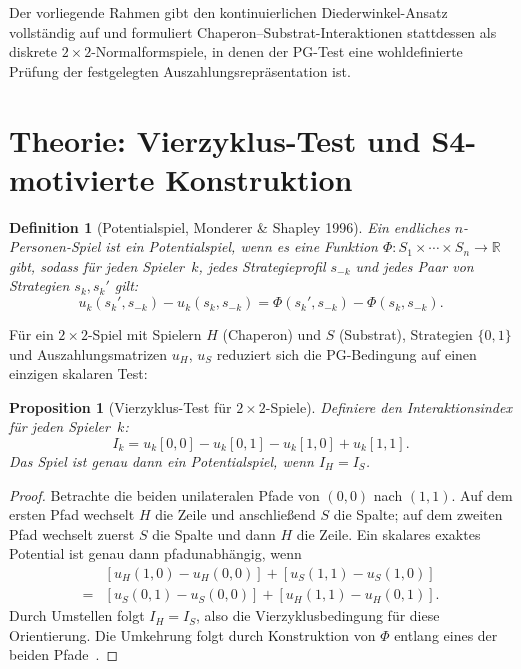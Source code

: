 \documentclass[12pt,a4paper]{article}
\newtheorem{proposition}{Proposition}
\newtheorem{definition}{Definition}
\begin{document}
Der vorliegende Rahmen gibt den kontinuierlichen Diederwinkel-Ansatz
vollständig auf und formuliert Chaperon--Substrat-Interaktionen
stattdessen als diskrete $2\times 2$-Normalformspiele, in denen der PG-Test eine
wohldefinierte Prüfung der festgelegten Auszahlungsrepräsentation ist.


\section{Theorie: Vierzyklus-Test und S4-motivierte Konstruktion}
\label{sec:theory}

\begin{definition}[Potentialspiel, Monderer \& Shapley 1996]
Ein endliches $n$-Personen-Spiel ist ein \emph{Potentialspiel}, wenn es
eine Funktion $\Phi: S_1 \times \cdots \times S_n \to \mathbb{R}$ gibt,
sodass für jeden Spieler~$k$, jedes Strategieprofil $s_{-k}$ und jedes
Paar von Strategien $s_k, s_k'$ gilt:
\begin{equation}
  u_k(s_k', s_{-k}) - u_k(s_k, s_{-k})
  = \Phi(s_k', s_{-k}) - \Phi(s_k, s_{-k}).
  \label{eq:pg_def}
\end{equation}
\end{definition}

Für ein $2\times 2$-Spiel mit Spielern $H$ (Chaperon) und $S$
(Substrat), Strategien $\{0, 1\}$ und Auszahlungsmatrizen $u_H$, $u_S$
reduziert sich die PG-Bedingung auf einen einzigen skalaren Test:

\begin{proposition}[Vierzyklus-Test für $2\times 2$-Spiele]
\label{prop:four_cycle}
Definiere den \emph{Interaktionsindex} für jeden Spieler~$k$:
\begin{equation}
  I_k = u_k[0,0] - u_k[0,1] - u_k[1,0] + u_k[1,1].
  \label{eq:interaction}
\end{equation}
Das Spiel ist genau dann ein Potentialspiel, wenn $I_H = I_S$.
\end{proposition}

\begin{proof}
Betrachte die beiden unilateralen Pfade von $(0,0)$ nach $(1,1)$. Auf
dem ersten Pfad wechselt $H$ die Zeile und anschließend $S$ die Spalte;
auf dem zweiten Pfad wechselt zuerst $S$ die Spalte und dann $H$ die
Zeile. Ein skalares exaktes Potential ist genau dann pfadunabhängig,
wenn
\begin{align}
 &[u_H(1,0)-u_H(0,0)]+[u_S(1,1)-u_S(1,0)] \nonumber\\
 ={}&[u_S(0,1)-u_S(0,0)]+[u_H(1,1)-u_H(0,1)].
\end{align}
Durch Umstellen folgt $I_H=I_S$, also die Vierzyklusbedingung für diese
Orientierung. Die Umkehrung folgt durch Konstruktion von $\Phi$ entlang
eines der beiden Pfade~\cite{MondererShapley1996}.
\end{proof}
\end{document}
